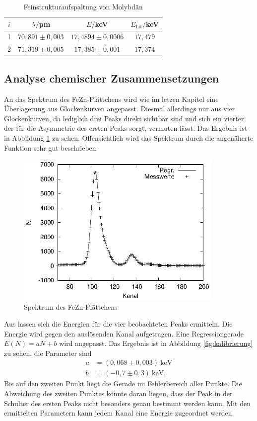\begin{table}[h]
  \centering
  \caption{Feinstrukturaufspaltung von Molybdän}
  \label{tab:nachtmessung}
  \begin{tabular}{c c c c}
    \toprule
    $i$ & $\lambda/$pm & $E/$keV & $E_\mathrm{Lit}/$keV\\
    \midrule
    1   & $70,891 \pm 0,003$ & $17,4894 \pm 0,0006$  & $17,479$\\
    2   & $71,319 \pm 0,005$ & $17,385 \pm 0,001$ &  $17,374$\\
    \bottomrule
  \end{tabular}
\end{table}

\subsection{Analyse chemischer Zusammensetzungen}
An das Spektrum des FeZn-Plättchens wird wie im letzen Kapitel eine Überlagerung aus Glockenkurven angepasst. Diesmal allerdings nur aus vier Glockenkurven, da lediglich drei Peaks direkt sichtbar sind und sich ein vierter, der für die Asymmetrie des ersten Peaks sorgt, vermuten lässt. Das Ergebnis ist in Abbildung \ref{fig:fezn} zu sehen. Offensichtlich wird das Spektrum durch die angenäherte Funktion sehr gut beschrieben. 

\begin{figure}[h]
  \centering
  \includegraphics[width=10cm]{data/Massenanteil/fezn.eps}
  \caption{Spektrum des FeZn-Plättchens}
  \label{fig:fezn}
\end{figure}

\newpage

Aus \cite{booklet} lassen sich die Energien für die vier beobachteten Peaks ermitteln. Die Energie wird gegen den auslösenden Kanal aufgetragen. Eine Regressiongerade $E(N)=aN+b$ wird angepasst. Das Ergebnis ist in Abbildung \ref{fig:kalibrierung} zu sehen, die Parameter sind
\begin{align*}
  a&=(0,068 \pm 0,003) \ \mathrm{keV}\\
  b&=(-0,7 \pm 0,3) \ \mathrm{keV.}
\end{align*}
 Bis auf den zweiten Punkt liegt die Gerade im Fehlerbereich aller Punkte. Die Abweichung des zweiten Punktes könnte daran liegen, dass der Peak in der Schulter des ersten Peaks nicht besonders genau bestimmt werden kann. Mit den ermittelten Parametern kann jedem Kanal eine Energie zugeordnet werden.

